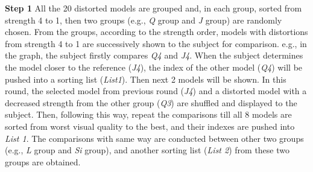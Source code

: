\textbf{Step 1}  All the 20 distorted models are grouped and, in each group, sorted from strength 4 to 1, then two groups (e.g., \textit{Q} group and \textit{J} group) are randomly chosen. From the groups, according to the strength order, models with distortions from strength 4 to 1 are successively shown to the subject for comparison. e.g., in the graph, the subject firstly compares \textit{Q4} and \textit{J4}.  When the subject determines the model closer to the reference (\textit{J4}), the index of the other model (\textit{Q4}) will be pushed into a sorting list (\textit{List1}). Then next 2 models will be shown. In this round, the selected model from previous round (\textit{J4}) and a distorted model with a decreased strength from the other group (\textit{Q3}) are shuffled and displayed to the subject. Then, following this way, repeat the comparisons till all 8 models are sorted from worst visual quality to the best, and their indexes are pushed into \textit{List 1}. The comparisons with same way are conducted between other two groups (e.g., \textit{L} group and \textit{Si} group), and another sorting list (\textit{List 2}) from these two groups are obtained. 